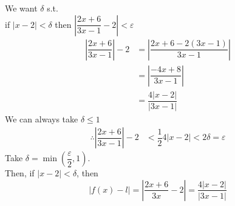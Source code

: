 \documentclass[fleqn]{article}
\begin{document}
We want $\delta$ s.t. \\
if $|x - 2| < \delta$ then $\left| \dfrac{2x + 6}{3x - 1} - 2 \right| < \varepsilon $
\begin{align*}
	\left|\dfrac{2x + 6}{3x - 1}\right| - 2 &= \left|\dfrac{2x + 6 - 2(3x - 1)}{3x -1}\right|\\
	&= \left|\dfrac{-4x + 8}{3x - 1}\right|\\
	&= \dfrac{4\left|x - 2\right|}{\left|3x - 1\right|}
\end{align*}
We can always take $\delta \leq 1$
\begin{align*}
	\therefore \left|\dfrac{2x + 6}{3x - 1}\right| - 2 &< \dfrac{1}{2} 4 \left|x - 2\right| < 2 \delta = \varepsilon
\end{align*}
Take $\delta = \min\left(\dfrac{\varepsilon}{2}, 1\right)$.\\
Then, if $|x - 2| < \delta$, then 
\begin{equation*}
	|f(x) - l| = \left|\dfrac{2x + 6}{3x} - 2\right| = \dfrac{4\left|x - 2 \right|}{\left|3x - 1\right|}
\end{equation*}
\end{document}
